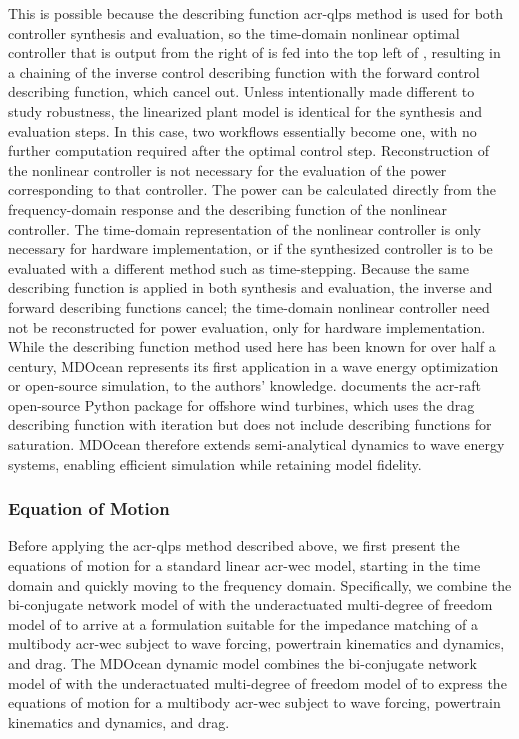 \ifdefined\DISSERTATION
    This is possible because the describing function \gls{acr-qlps} method is used for both controller synthesis and evaluation, so the time-domain nonlinear optimal controller that is output from the right of  is fed into the top left of , resulting in a chaining of the inverse control describing function with the forward control describing function, which cancel out.
    Unless intentionally made different to study robustness, the linearized plant model is identical for the synthesis and evaluation steps.
    In this case, two workflows essentially become one, with no further computation required after the optimal control step.
    Reconstruction of the nonlinear controller is not necessary for the evaluation of the power corresponding to that controller.
    The power can be calculated directly from the frequency-domain response and the describing function of the nonlinear controller.
    The time-domain representation of the nonlinear controller is only necessary for hardware implementation, or if the synthesized controller is to be evaluated with a different method such as time-stepping.
\else
    Because the same describing function is applied in both synthesis and evaluation, the inverse and forward describing functions cancel; the time-domain nonlinear controller need not be reconstructed for power evaluation, only for hardware implementation.
\fi
While the describing function method used here has been known for over half a century, MDOcean represents its first application in a wave energy optimization or open-source simulation, to the authors' knowledge.
\citet{hall_open-source_2022} documents the \gls{acr-raft} open-source Python package for offshore wind turbines, which uses the drag describing function with iteration but does not include describing functions for saturation.
MDOcean therefore extends semi-analytical dynamics to wave energy systems, enabling efficient simulation while retaining model fidelity.

\subsubsection{Equation of Motion}\label{sec:eom}
\ifdefined\DISSERTATION
    Before applying the \gls{acr-qlps} method described above, we first present the equations of motion for a standard linear \gls{acr-wec} model, starting in the time domain and quickly moving to the frequency domain.
    Specifically, we combine the bi-conjugate network model of \citet{coe_co-design_2025} with the underactuated multi-degree of freedom model of \citet{faedo_principle_2022} to arrive at a formulation suitable for the impedance matching of a multibody \gls{acr-wec} subject to wave forcing, powertrain kinematics and dynamics, and drag.
\else
    The MDOcean dynamic model combines the bi-conjugate network model of \citet{coe_co-design_2025} with the underactuated multi-degree of freedom model of \citet{faedo_principle_2022} to express the equations of motion for a multibody \gls{acr-wec} subject to wave forcing, powertrain kinematics and dynamics, and drag.
\fi

